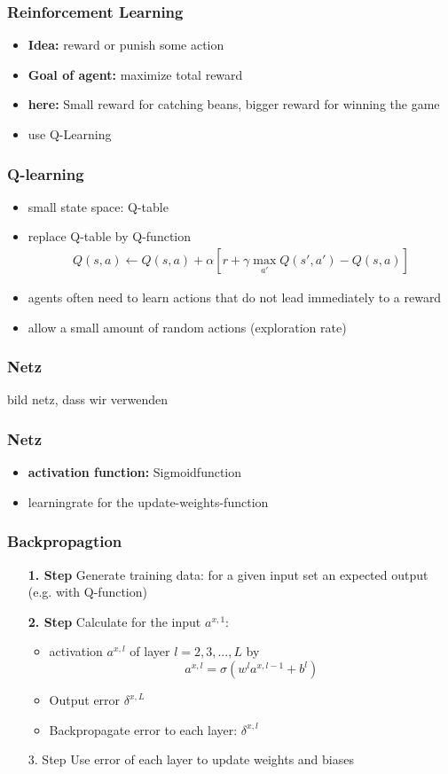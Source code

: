 \documentclass{beamer}
\begin{document}
 \begin{frame}
 \frametitle{Reinforcement Learning}
 \begin{itemize}
 \item \textbf{Idea:} reward or punish some action
 \item \textbf{Goal of agent:} maximize total reward
 \item \textbf{here:} Small reward for catching beans, bigger reward for winning the game
 \item use Q-Learning
 \end{itemize}
 \end{frame}
 
  \begin{frame}
  \frametitle{Q-learning}
 \begin{itemize}
 \item small state space: Q-table
  \item replace Q-table by Q-function 
  \begin{align}
  Q(s,a) \leftarrow Q(s,a)+\alpha [r+\gamma \max_{a'} Q(s',a') -Q(s,a)]
  \end{align}
 \item agents often need to learn actions that do not lead immediately to a reward
 \item allow a small amount of random actions (exploration rate)
 \end{itemize}
 \end{frame}
 
 \begin{frame}
 \frametitle{Netz}
 bild netz, dass wir verwenden
 \end{frame}
  \begin{frame}
 \frametitle{Netz}
\begin{itemize}
\item \textbf{activation function:} Sigmoidfunction
\item learningrate for the update-weights-function
\end{itemize}
 \end{frame}
 
 \begin{frame}
 \frametitle{Backpropagtion}
 \begin{itemize}
 \item[\textbf{1. Step}] Generate training data: for a given input set an expected output (e.g. with Q-function)
 \item[\textbf{2. Step}] Calculate for the input $a^{x,1}$:
 \begin{itemize}
 \item activation $a^{x,l}$ of layer $l=2,3,...,L$ by
 $$a^{x,l} = \sigma(w^l a^{x,l-1} + b^l)$$
 \item Output error $\delta^{x,L}$
 \item Backpropagate error to each layer: $\delta^{x,l}$
 \end{itemize}
 \item[3. Step] Use error of each layer to update weights and biases 
 \end{itemize}
 \end{frame}
\end{document}
